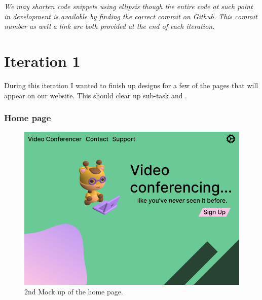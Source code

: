 \textit{We may shorten code snippets using ellipsis though the
entire code at such point in development is available by finding the 
correct commit on Github. This commit number as well a link are both
provided at the end of each iteration.}

\section{Iteration 1}

During this iteration I wanted to finish up designs for a few 
of the pages that will appear on our website. This should 
clear up sub-task  and .

\subsubsection{Home page}

\begin{figure}[H]
\centering

\includegraphics[scale=0.2]{Images/HomeUI_2.png}

\caption{2nd Mock up of the home page.}
\label{fig:ui2}
\end{figure}

